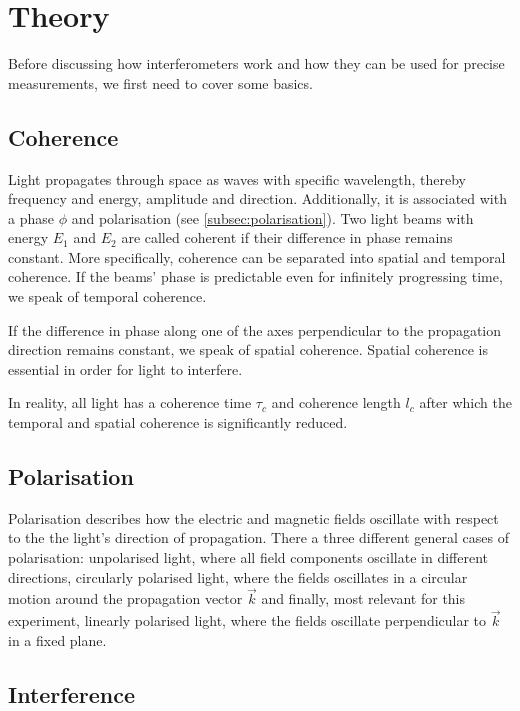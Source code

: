 \section{Theory}
\label{sec:theorie}

Before discussing how interferometers work and how they can be used for precise measurements, we first need to cover some basics.

\subsection{Coherence}
\label{subsec:coherence}

Light propagates through space as waves with specific wavelength, thereby frequency and energy, amplitude and direction. 
Additionally, it is associated with a phase $\phi$ and polarisation (see \autoref{subsec:polarisation}).
Two light beams with energy $E_1$ and $E_2$ are called coherent if their difference in phase remains constant.
More specifically, coherence can be separated into spatial and temporal coherence.
If the beams' phase is predictable even for infinitely progressing time, we speak of temporal coherence.

If the difference in phase along one of the axes perpendicular to the propagation direction remains constant, we speak of spatial coherence.
Spatial coherence is essential in order for light to interfere.

In reality, all light has a coherence time $\tau_c$ and coherence length $l_c$ after which the temporal and spatial coherence is significantly reduced.


\subsection{Polarisation}
\label{subsec:polarisation}

Polarisation describes how the electric and magnetic fields oscillate with respect to the the light's direction of propagation.
There a three different general cases of polarisation: unpolarised light, where all field components oscillate in different directions, circularly polarised light,
where the fields oscillates in a circular motion around the propagation vector $\vec{k}$ and finally, most relevant for this experiment, linearly polarised light, where
the fields oscillate perpendicular to $\vec{k}$ in a fixed plane.


\subsection{Interference}
\label{subsec:interference}

